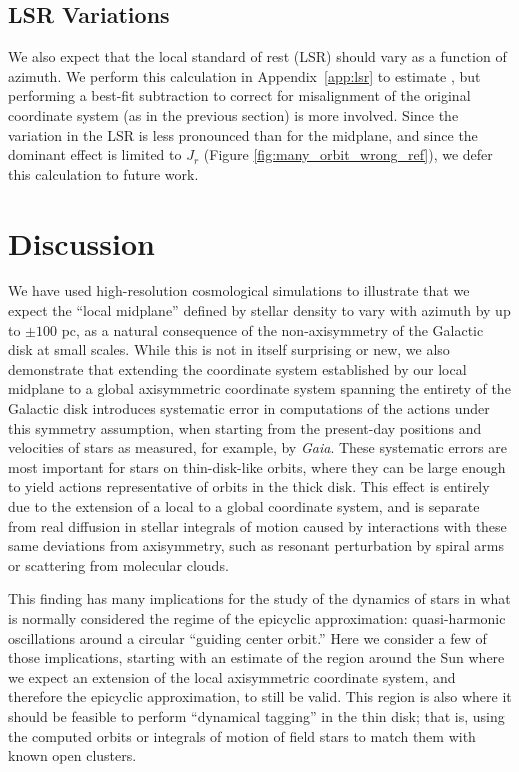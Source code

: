 \documentclass[twocolumn]{aastex62}
\begin{document}
\subsection{LSR Variations} \label{ssec:lsr_var}
We also expect that the local standard of rest (LSR) should vary as a function
of azimuth. We perform this calculation in Appendix~\ref{app:lsr} to estimate
, but performing a best-fit subtraction to correct for misalignment of the
original coordinate system (as in the previous section) is more involved.
Since the variation in the LSR is less pronounced than for the midplane, and
since the dominant effect is limited to $J_r$ (Figure
\ref{fig:many_orbit_wrong_ref}), we defer this calculation to future work.


\section{Discussion} \label{sec:discussion}
We have used high-resolution cosmological simulations to illustrate that we
expect the ``local midplane'' defined by stellar density to vary with azimuth
by up to $\pm 100$ pc, as a natural consequence of the non-axisymmetry of the
Galactic disk at small scales. While this is not in itself surprising or new,
we also demonstrate that extending the coordinate system established by our
local midplane to a global axisymmetric coordinate system spanning the
entirety of the Galactic disk introduces systematic error in computations of
the actions under this symmetry assumption, when starting from the present-day
positions and velocities of stars as measured, for example, by \emph{Gaia}.
These systematic errors are most important for stars on thin-disk-like orbits,
where they can be large enough to yield actions representative of orbits in
the thick disk. This effect is entirely due to the extension of a local to a
global coordinate system, and is separate from real diffusion in stellar
integrals of motion caused by interactions with these same deviations from
axisymmetry, such as resonant perturbation by spiral arms or scattering from
molecular clouds.

This finding has many implications for the study of the dynamics of stars in
what is normally considered the regime of the epicyclic approximation:
quasi-harmonic oscillations around a circular ``guiding center orbit.'' Here
we consider a few of those implications, starting with an estimate of the
region around the Sun where we expect an extension of the local axisymmetric
coordinate system, and therefore the epicyclic approximation, to still be
valid. This region is also where it should be feasible to perform ``dynamical
tagging'' in the thin disk; that is, using the computed orbits or integrals of
motion of field stars to match them with known open clusters.
\end{document}
